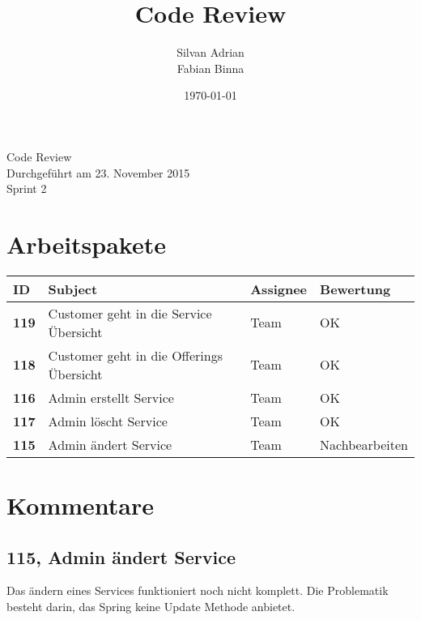 \documentclass[11pt]{scrartcl}
\title{Code Review}
\author{Silvan Adrian \\ Fabian Binna}
\date{\today{}}
\begin{document}
\def\arraystretch{1.5}
\begin{titlepage}
\begin{center}
\vspace{10em}

\vspace{10em}
\end{center}
\begin{center}
\huge {Code Review}\\

Durchgeführt am 23. November 2015\\
Sprint 2
\end{center}

\end{titlepage}

\newpage
\tableofcontents
\newpage

\section{Arbeitspakete}

\begin{center}

\begin{tabularx}{\linewidth}{l l l l}
\textbf{ID} & \textbf{Subject} & \textbf{Assignee} & \textbf{Bewertung}\\
\hline
\textbf{119} & Customer geht in die Service Übersicht & Team & OK \\
\textbf{118} & Customer geht in die Offerings Übersicht & Team & OK\\
\textbf{116} & Admin erstellt Service & Team & OK\\
\textbf{117} & Admin löscht Service & Team & OK\\
\textbf{115} & Admin ändert Service & Team & Nachbearbeiten\\
\end{tabularx}

\end{center}
\newpage

\section{Kommentare}

\subsection{115, Admin ändert Service}
Das ändern eines Services funktioniert noch nicht komplett. Die Problematik besteht darin, das Spring keine Update Methode anbietet.
\end{document}
